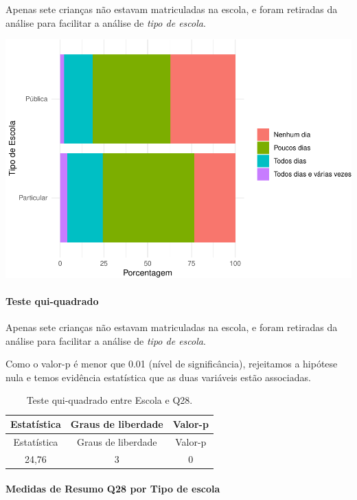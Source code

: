 \documentclass[]{article}
\let\oldparagraph\paragraph
\renewcommand{\paragraph}[1]{\oldparagraph{#1}\mbox{}}
\begin{document}
Apenas sete crianças não estavam matriculadas na escola, e foram retiradas da análise para facilitar a análise de \emph{tipo de escola}.

\begin{center}\includegraphics[width=0.75\linewidth]{relatorio_covid19_files/figure-latex/unnamed-chunk-879-1} \end{center}

\hypertarget{teste-qui-quadrado-76}{%
\paragraph{Teste qui-quadrado}\label{teste-qui-quadrado-76}}

Apenas sete crianças não estavam matriculadas na escola, e foram retiradas da análise para facilitar a análise de \emph{tipo de escola}.

Como o valor-p é menor que 0.01 (nível de significância), rejeitamos a hipótese nula e temos evidência estatística que as duas variáveis estão associadas.

\begin{longtable}[]{@{}ccc@{}}
\caption{\label{tab:unnamed-chunk-881}Teste qui-quadrado entre Escola e Q28.}\tabularnewline
\toprule
Estatística & Graus de liberdade & Valor-p\tabularnewline
\midrule
\endfirsthead
\toprule
Estatística & Graus de liberdade & Valor-p\tabularnewline
\midrule
\endhead
24,76 & 3 & 0\tabularnewline
\bottomrule
\end{longtable}

\cleardoublepage

\hypertarget{medidas-de-resumo-q28-por-tipo-de-escola}{%
\paragraph{Medidas de Resumo Q28 por Tipo de escola}\label{medidas-de-resumo-q28-por-tipo-de-escola}}
\end{document}
